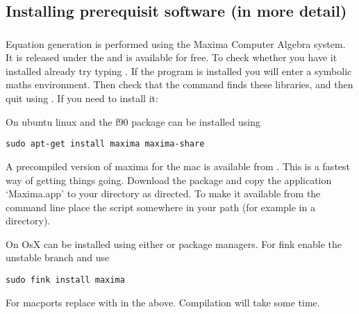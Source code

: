 \subsection{Installing prerequisit software (in more detail)\label{sec:thirdparty}}

\subsubsection{ \label{sec:maxima}}

Equation generation is performed using the Maxima Computer Algebra system.  It is released under the  and is available for free.  To check whether you have it installed already try typing .  If the program is installed you will enter a symbolic maths environment.  Then check that the command  finds these libraries, and then quit using .  If you need to install it:


On ubuntu linux  and the f90 package can be installed using
%
\begin{verbatim}
sudo apt-get install maxima maxima-share
\end{verbatim}


A precompiled version of maxima for the mac is available from .  This is a fastest way of getting things going.  Download the package and copy the application `Maxima.app' to your \code{\\Applications} directory as directed.  To make it available from the command line place the script  somewhere in your path (for example in a  directory).


On OsX  can be installed using either  or  package managers.  For fink enable the unstable branch and use
%
\begin{verbatim}
sudo fink install maxima
\end{verbatim}
%
For macports replace  with  in the above.  Compilation will take some time.

